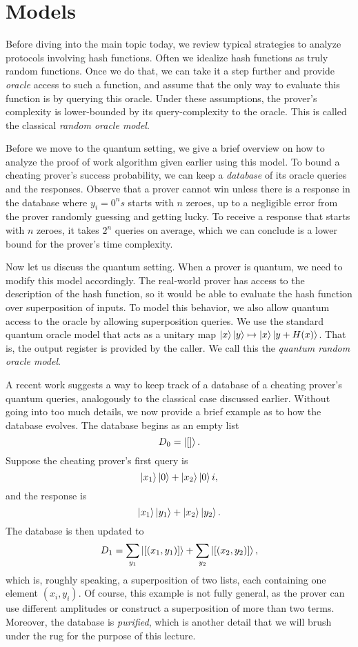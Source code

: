 \section{Models}

Before diving into the main topic today, we review typical strategies to analyze protocols involving hash functions.
Often we idealize hash functions as truly random functions.
Once we do that, we can take it a step further and provide \emph{oracle} access to such a function,
and assume that the only way to evaluate this function is by querying this oracle.
Under these assumptions, the prover's complexity is lower-bounded by its query-complexity to the oracle.
This is called the classical \emph{random oracle model}.

Before we move to the quantum setting, we give a brief overview on how to analyze the proof of work algorithm given earlier using this model.
To bound a cheating prover's success probability,
we can keep a \emph{database} of its oracle queries and the responses.
Observe that a prover cannot win unless there is a response in the database where $y_i=0^ns$ starts with $n$ zeroes,
up to a negligible error from the prover randomly guessing and getting lucky.
To receive a response that starts with $n$ zeroes, it takes $2^n$ queries on average,
which we can conclude is a lower bound for the prover's time complexity.

Now let us discuss the quantum setting.
When a prover is quantum, we need to modify this model accordingly.
The real-world prover has access to the description of the hash function,
so it would be able to evaluate the hash function over superposition of inputs.
To model this behavior, we also allow quantum access to the oracle by allowing superposition queries.
We use the standard quantum oracle model that acts as a unitary map $\ket{x}\ket{y}\mapsto\ket{x}\ket{y+H(x)}$.
That is, the output register is provided by the caller.
We call this the \emph{quantum random oracle model}.

A recent work \cite{compressed-oracles} suggests a way to keep track of a database of a cheating prover's quantum queries,
analogously to the classical case discussed earlier.
Without going into too much details,
we now provide a brief example as to how the database evolves.
The database begins as an empty list
$$D_0=\ket{[]}.$$
Suppose the cheating prover's first query is
$$\ket{x_1}\ket{0}+\ket{x_2}\ket{0}i,$$
and the response is
$$\ket{x_1}\ket{y_1}+\ket{x_2}\ket{y_2}.$$
The database is then updated to
$$D_1=\sum_{y_1}\ket{[(x_1, y_1)]} + \sum_{y_2}\ket{[(x_2, y_2)]},$$
which is, roughly speaking, a superposition of two lists,
each containing one element $(x_i, y_i)$.
Of course, this example is not fully general,
as the prover can use different amplitudes or construct a superposition of more than two terms.
Moreover, the database is \emph{purified},
which is another detail that we will brush under the rug for the purpose of this lecture.

